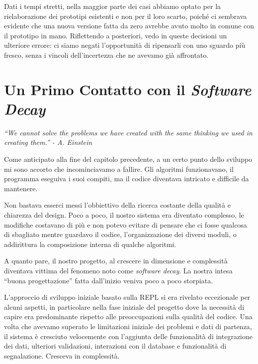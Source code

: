 \documentclass[12pt]{report}
\begin{document}
Dati i tempi stretti, nella maggior parte dei casi abbiamo optato per
la rielaborazione dei prototipi esistenti e non per il loro scarto,
poiché ci sembrava evidente che una nuova versione fatta da zero avrebbe avuto
molto in comune con il prototipo in mano. Riflettendo a posteriori, vedo
in queste decisioni un ulteriore errore: ci siamo negati l'opportunità 
di ripensarli con uno sguardo più fresco, senza i vincoli 
dell'incertezza che ne avevamo già affrontato. 

% 
%
%
\chapter{Un Primo Contatto con il \textit{Software Decay}}
\label{cap:software_decay}

\vspace{1cm}
\begin{flushright}
	\textit{
	``We cannot solve the problems we have created
	with the same thinking we used in creating them.'' - A. Einstein
	}
\end{flushright}
\vspace{1cm}

Come anticipato alla fine del capitolo precedente, a un certo punto
dello sviluppo mi sono accorto che incominciavamo a fallire. 
Gli algoritmi funzionavano, il programma eseguiva i suoi compiti, ma il
codice diventava intricato e difficile da mantenere.

Non bastava esserci messi l'obbiettivo della ricerca costante della qualità e 
chiarezza del design. Poco a poco, il nostro sistema era diventato complesso, 
le modifiche costavano di più e non potevo evitare di pensare che ci fosse 
qualcosa di sbagliato mentre guardavo il codice, l'organizzazione dei diversi 
moduli, o addirittura la composizione interna di qualche algoritmi. 

A quanto pare, il nostro progetto, al crescere in dimensione e complessità 
diventava vittima del fenomeno noto come \textit{software decay}.
La nostra intesa ``buona progettazione'' fatta 
dall'inizio veniva poco a poco storpiata.

L'approccio di sviluppo iniziale basato sulla REPL si era rivelato eccezionale 
per alcuni aspetti, in particolare nella fase iniziale del progetto dove la 
necessità di capire era predominante rispetto alle preoccupazioni sulla 
qualità del codice. Una volta che avevamo superato le limitazioni iniziale dei 
problemi e dati di partenza, il sistema è cresciuto velocemente con l'aggiunta 
delle funzionalità di integrazione dei dati, ulteriori validazioni, interazioni 
con il database e funzionalità di segnalazione. Cresceva in complessità. 
\end{document}
